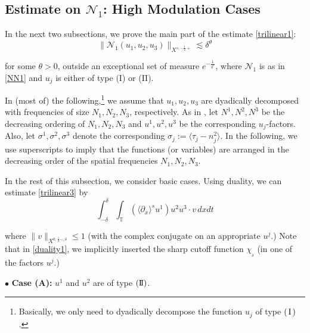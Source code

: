 \documentclass[11pt]{amsart}
\numberwithin{equation}{section} \numberwithin{theorem}{section}
\begin{document}
\subsection{Estimate on $\mathcal{N}_1 $: High Modulation Cases}  \label{SUBSEC:LWP3}

In the next two subsections, we prove the main part of the estimate \eqref{trilinear1}: 
\begin{equation}
	\label{trilinear3} \| \mathcal{N}_1(u_1, u_2, u_3) \|_{X^{s, -\frac{1}{2}+}} \lesssim {\delta}^\theta 
\end{equation}

{
\noindent} for some $ \theta > 0$, 
outside an exceptional set of measure $e^{-\frac{1}{{\delta}^c}}$, where $\mathcal{N}_1$ is as in \eqref{NN1}
and $u_j$ is either of type (I) or (II).

In (most of) the following,\footnote{Basically, we only need to dyadically decompose the function $u_j$ of type $({\hspace{0.5mm}\text{I}\hspace{0.5mm}})$.} we assume that $u_1, u_2, u_3$
are dyadically decomposed with frequencies of size $N_1, N_2, N_3$, respectively.
As in \cite{Bourgain:1996p446}, 
let $N^1, N^2, N^3$ be the decreasing ordering of $N_1, N_2, N_3$ and $u^1, u^2, u^3$ be the corresponding $u_j$-factors. Also, let ${\sigma}^1, {\sigma}^2, {\sigma}^3$ denote the corresponding ${\sigma}_j := {\langle {\tau_j - n_j^2} \rangle}$. In the following, we use superscripts to imply that the functions (or variables) are arranged in the decreasing order of the spatial frequencies $N_1, N_2, N_3$.

In the rest of this subsection, we consider basic cases. 
Using duality, we can estimate \eqref{trilinear3} by 
\begin{equation}
	\label{duality1} \int_{-{\delta}}^{\delta} \int_{\mathbb{T}} ({\langle {
\partial_x} \rangle}^s u^1) u^2 u^3 \cdot v \, dx dt 
\end{equation}

{
\noindent} where $\| v\|_{X^{0, \frac{1}{2}-, {\delta}}} \leq 1$ (with the complex conjugate on an appropriate $u^j$.)
Note that in \eqref{duality1}, we implicitly inserted the sharp cutoff function $\chi_{_{\delta}}$
(in one of the factors $u^j$.)

\medskip

{
\noindent} $\bullet$ {\bf Case (A):} $u^1$ and $u^2$ are of type $({\text{I \hspace{-2.8mm} I} })$.
\end{document}
